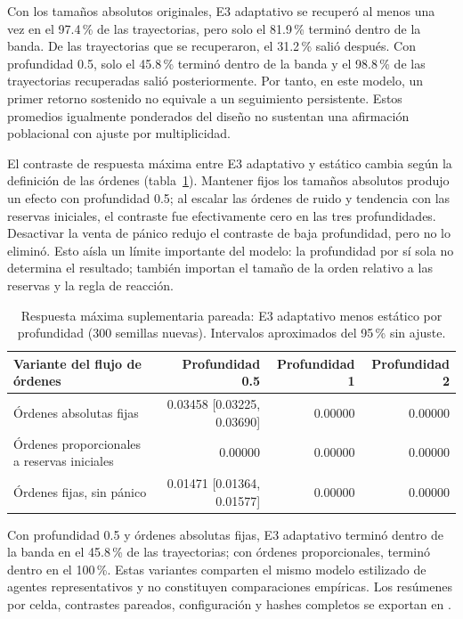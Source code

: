 Con los tamaños absolutos originales, E3 adaptativo se recuperó al menos una vez en el 97.4\,\% de las trayectorias, pero solo el 81.9\,\% terminó dentro de la banda. De las trayectorias que se recuperaron, el 31.2\,\% salió después. Con profundidad 0.5, solo el 45.8\,\% terminó dentro de la banda y el 98.8\,\% de las trayectorias recuperadas salió posteriormente. Por tanto, en este modelo, un primer retorno sostenido no equivale a un seguimiento persistente. Estos promedios igualmente ponderados del diseño no sustentan una afirmación poblacional con ajuste por multiplicidad.

El contraste de respuesta máxima entre E3 adaptativo y estático cambia según la definición de las órdenes (tabla~\ref{tab:engineering-sensitivity}). Mantener fijos los tamaños absolutos produjo un efecto con profundidad 0.5; al escalar las órdenes de ruido y tendencia con las reservas iniciales, el contraste fue efectivamente cero en las tres profundidades. Desactivar la venta de pánico redujo el contraste de baja profundidad, pero no lo eliminó. Esto aísla un límite importante del modelo: la profundidad por sí sola no determina el resultado; también importan el tamaño de la orden relativo a las reservas y la regla de reacción.

\begin{table}[htbp]
\centering
\caption{Respuesta máxima suplementaria pareada: E3 adaptativo menos estático por profundidad (300 semillas nuevas). Intervalos aproximados del 95\,\% sin ajuste.}
\label{tab:engineering-sensitivity}
\small
\begin{tabular}{@{}lrrr@{}}
\toprule
Variante del flujo de órdenes & Profundidad 0.5 & Profundidad 1 & Profundidad 2 \\
\midrule
Órdenes absolutas fijas & 0.03458 [0.03225, 0.03690] & 0.00000 & 0.00000 \\
Órdenes proporcionales a reservas iniciales & 0.00000 & 0.00000 & 0.00000 \\
Órdenes fijas, sin pánico & 0.01471 [0.01364, 0.01577] & 0.00000 & 0.00000 \\
\bottomrule
\end{tabular}
\end{table}

Con profundidad 0.5 y órdenes absolutas fijas, E3 adaptativo terminó dentro de la banda en el 45.8\,\% de las trayectorias; con órdenes proporcionales, terminó dentro en el 100\,\%. Estas variantes comparten el mismo modelo estilizado de agentes representativos y no constituyen comparaciones empíricas. Los resúmenes por celda, contrastes pareados, configuración y hashes completos se exportan en .


